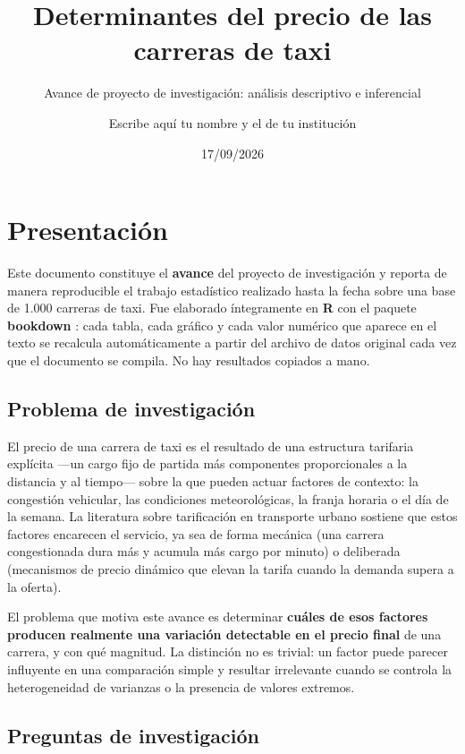\documentclass[
]{book}
\title{Determinantes del precio de las carreras de taxi}
\subtitle{Avance de proyecto de investigación: análisis descriptivo e inferencial}
\author{Escribe aquí tu nombre y el de tu institución}
\date{17/09/2026}
\begin{document}
\maketitle

{
\setcounter{tocdepth}{1}
\tableofcontents
}
\chapter*{Presentación}\label{presentaciuxf3n}

Este documento constituye el \textbf{avance} del proyecto de investigación y reporta de manera
reproducible el trabajo estadístico realizado hasta la fecha sobre una base de
1.000 carreras de taxi. Fue elaborado íntegramente en \textbf{R}
\citep{rcore} con el paquete \textbf{bookdown} \citep{bookdown}: cada tabla, cada gráfico y cada valor
numérico que aparece en el texto se recalcula automáticamente a partir del archivo de datos
original cada vez que el documento se compila. No hay resultados copiados a mano.

\section*{Problema de investigación}\label{problema-de-investigaciuxf3n}

El precio de una carrera de taxi es el resultado de una estructura tarifaria explícita ---un
cargo fijo de partida más componentes proporcionales a la distancia y al tiempo--- sobre la que
pueden actuar factores de contexto: la congestión vehicular, las condiciones meteorológicas,
la franja horaria o el día de la semana. La literatura sobre tarificación en transporte
urbano sostiene que estos factores encarecen el servicio, ya sea de forma mecánica (una
carrera congestionada dura más y acumula más cargo por minuto) o deliberada (mecanismos de
precio dinámico que elevan la tarifa cuando la demanda supera a la oferta).

El problema que motiva este avance es determinar \textbf{cuáles de esos factores producen realmente
una variación detectable en el precio final} de una carrera, y con qué magnitud. La
distinción no es trivial: un factor puede parecer influyente en una comparación simple y
resultar irrelevante cuando se controla la heterogeneidad de varianzas o la presencia de
valores extremos.

\section*{Preguntas de investigación}\label{preguntas-de-investigaciuxf3n}
\end{document}
